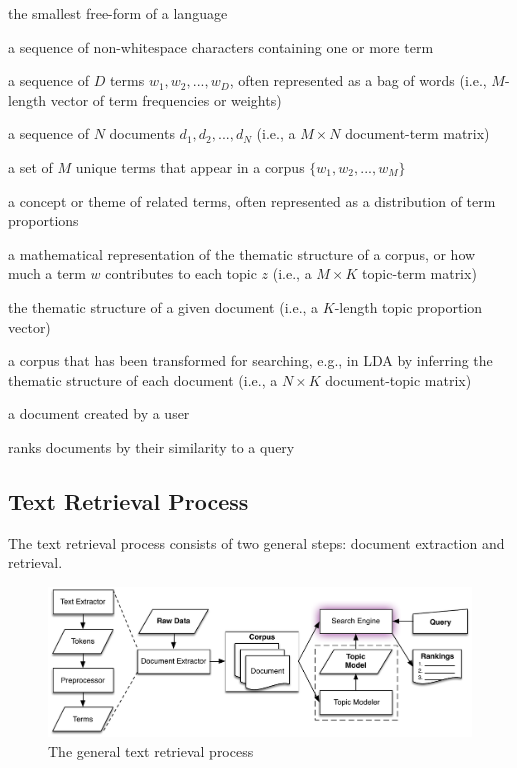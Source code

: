 \documentclass[12pt,draft]{Manuscript}
\begin{document}
\begin{body}
\begin{description}
\itemsep1pt\parskip0pt
\item[term (word), \(w\):]
the smallest free-form of a language
\item[token:]
a sequence of non-whitespace characters containing one or more term
\item[document, \(d\):]
a sequence of \(D\) terms \(w_1, w_2, ..., w_D\), often represented as a
bag of words (i.e., \(M\)-length vector of term frequencies or weights)
\item[corpus, \(C\):]
a sequence of \(N\) documents \(d_1, d_2, ..., d_N\) (i.e., a
\(M \times N\) document-term matrix)
\item[vocabulary, \(V\):]
a set of \(M\) unique terms that appear in a corpus
\(\{w_1, w_2, ..., w_M\}\)
\item[topic, \(z\):]
a concept or theme of related terms, often represented as a distribution
of term proportions
\item[topic model, \(\phi\):]
a mathematical representation of the thematic structure of a corpus, or
how much a term \(w\) contributes to each topic \(z\) (i.e., a
\(M \times K\) topic-term matrix)
\item[inferrence, \(\theta_d\)]
the thematic structure of a given document (i.e., a \(K\)-length topic
proportion vector)
\item[index, \(\theta\):]
a corpus that has been transformed for searching, e.g., in LDA by
inferring the thematic structure of each document (i.e., a
\(N \times K\) document-topic matrix)
\item[query, \(q\):]
a document created by a user
\item[search engine:]
ranks documents by their similarity to a query
\end{description}

\subsection{Text Retrieval Process}\label{text-retrieval-process}

The text retrieval process consists of two general steps: document
extraction and retrieval.

\begin{figure}[htbp]
\centering
\includegraphics{figures/text-retrieval.pdf}
\caption{The general text retrieval process\label{fig:TR}}
\end{figure}


\end{body}
\end{document}
